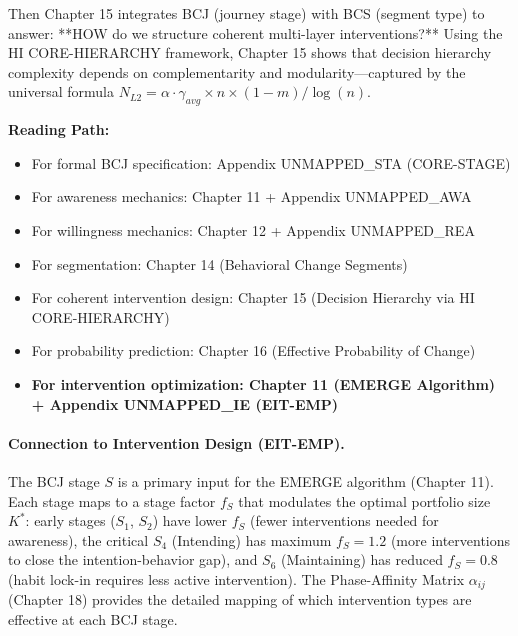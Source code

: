 Then Chapter 15 integrates BCJ (journey stage) with BCS (segment type) to answer:
**HOW do we structure coherent multi-layer interventions?** Using the HI CORE-HIERARCHY
framework, Chapter 15 shows that decision hierarchy complexity depends on complementarity
and modularity---captured by the universal formula $N_{L2} = \alpha \cdot \gamma_{avg} \times n \times (1-m) / \log(n)$.

\begin{cross-reference}
\textbf{Reading Path:}
\begin{itemize}
    \item For formal BCJ specification: Appendix UNMAPPED_STA (CORE-STAGE)
    \item For awareness mechanics: Chapter 11 + Appendix UNMAPPED_AWA
    \item For willingness mechanics: Chapter 12 + Appendix UNMAPPED_REA
    \item For segmentation: Chapter 14 (Behavioral Change Segments)
    \item For coherent intervention design: Chapter 15 (Decision Hierarchy via HI CORE-HIERARCHY)
    \item For probability prediction: Chapter 16 (Effective Probability of Change)
    \item \textbf{For intervention optimization: Chapter 11 (EMERGE Algorithm) + Appendix UNMAPPED_IE (EIT-EMP)}
\end{itemize}
\end{cross-reference}

\paragraph{Connection to Intervention Design (EIT-EMP).}
The BCJ stage $S$ is a primary input for the EMERGE algorithm (Chapter 11). Each stage
maps to a stage factor $f_S$ that modulates the optimal portfolio size $K^*$: early stages
($S_1$, $S_2$) have lower $f_S$ (fewer interventions needed for awareness), the critical
$S_4$ (Intending) has maximum $f_S = 1.2$ (more interventions to close the intention-behavior gap),
and $S_6$ (Maintaining) has reduced $f_S = 0.8$ (habit lock-in requires less active intervention).
The Phase-Affinity Matrix $\alpha_{ij}$ (Chapter 18) provides the detailed mapping of which
intervention types are effective at each BCJ stage.

